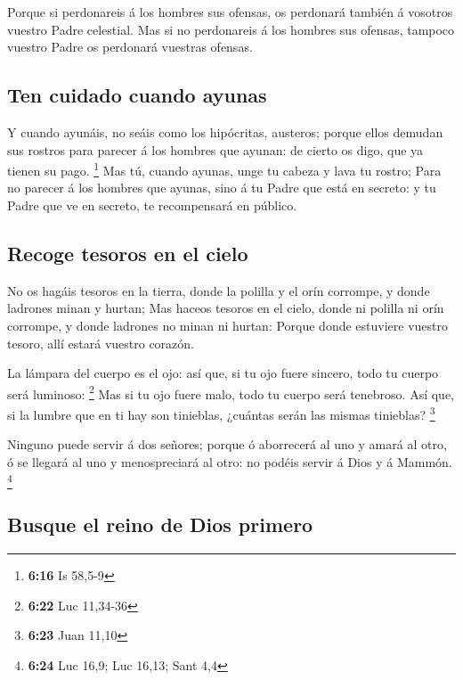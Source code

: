  Porque si perdonareis á los hombres sus ofensas, os
perdonará también á vosotros vuestro Padre celestial.  Mas
si no perdonareis á los hombres sus ofensas, tampoco vuestro Padre os
perdonará vuestras ofensas.

\hypertarget{ten-cuidado-cuando-ayunas}{%
\subsection{Ten cuidado cuando ayunas}\label{ten-cuidado-cuando-ayunas}}

 Y cuando ayunáis, no seáis como los hipócritas, austeros;
porque ellos demudan sus rostros para parecer á los hombres que ayunan:
de cierto os digo, que ya tienen su pago. \footnote{\textbf{6:16} Is
  58,5-9}  Mas tú, cuando ayunas, unge tu cabeza y lava tu
rostro;  Para no parecer á los hombres que ayunas, sino á
tu Padre que está en secreto: y tu Padre que ve en secreto, te
recompensará en público.

\hypertarget{recoge-tesoros-en-el-cielo}{%
\subsection{Recoge tesoros en el
cielo}\label{recoge-tesoros-en-el-cielo}}

 No os hagáis tesoros en la tierra, donde la polilla y el
orín corrompe, y donde ladrones minan y hurtan;  Mas haceos
tesoros en el cielo, donde ni polilla ni orín corrompe, y donde ladrones
no minan ni hurtan:  Porque donde estuviere vuestro tesoro,
allí estará vuestro corazón.

 La lámpara del cuerpo es el ojo: así que, si tu ojo fuere
sincero, todo tu cuerpo será luminoso: \footnote{\textbf{6:22} Luc
  11,34-36}  Mas si tu ojo fuere malo, todo tu cuerpo será
tenebroso. Así que, si la lumbre que en ti hay son tinieblas, ¿cuántas
serán las mismas tinieblas? \footnote{\textbf{6:23} Juan 11,10}

 Ninguno puede servir á dos señores; porque ó aborrecerá al
uno y amará al otro, ó se llegará al uno y menospreciará al otro: no
podéis servir á Dios y á Mammón. \footnote{\textbf{6:24} Luc 16,9; Luc
  16,13; Sant 4,4}

\hypertarget{busque-el-reino-de-dios-primero}{%
\subsection{Busque el reino de Dios
primero}\label{busque-el-reino-de-dios-primero}}

